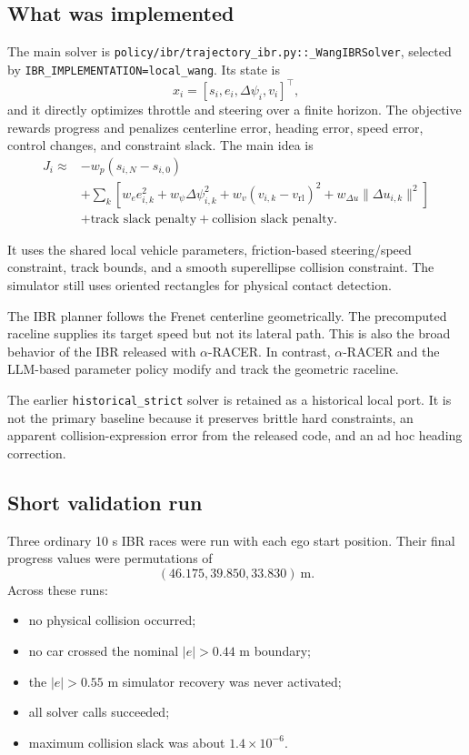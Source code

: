 \documentclass[11pt]{article}
\newcommand{\code}[1]{\texttt{#1}}
\begin{document}
\subsection{What was implemented}

The main solver is \code{policy/ibr/trajectory\_ibr.py::\_WangIBRSolver}, selected by
\code{IBR\_IMPLEMENTATION=local\_wang}. Its state is
\[
  x_i=[s_i,e_i,\Delta\psi_i,v_i]^\top,
\]
and it directly optimizes throttle and steering over a finite horizon. The
objective rewards progress and penalizes centerline error, heading error, speed
error, control changes, and constraint slack. The main idea is
\[
\begin{split}
J_i \approx{}&-w_p(s_{i,N}-s_{i,0})\\
&+\sum_k\left[
w_e e_{i,k}^2+w_\psi\Delta\psi_{i,k}^2
+w_v(v_{i,k}-v_{\mathrm{rl}})^2
+w_{\Delta u}\|\Delta u_{i,k}\|^2\right]\\
&+\text{track slack penalty}+\text{collision slack penalty}.
\end{split}
\]

It uses the shared local vehicle parameters, friction-based steering/speed
constraint, track bounds, and a smooth superellipse collision constraint. The
simulator still uses oriented rectangles for physical contact detection.

The IBR planner follows the Frenet centerline geometrically. The precomputed
raceline supplies its target speed but not its lateral path. This is also the
broad behavior of the IBR released with $\alpha$-RACER. In contrast,
$\alpha$-RACER and the LLM-based parameter policy modify and track the geometric
raceline.

The earlier \code{historical\_strict} solver is retained as a historical local
port. It is not the primary baseline because it preserves brittle hard
constraints, an apparent collision-expression error from the released code, and
an ad hoc heading correction.

\subsection{Short validation run}

Three ordinary 10 s IBR races were run with each ego start position. Their final
progress values were permutations of
\[
  (46.175,39.850,33.830)\ \mathrm{m}.
\]
Across these runs:
\begin{itemize}
  \item no physical collision occurred;
  \item no car crossed the nominal $|e|>0.44$ m boundary;
  \item the $|e|>0.55$ m simulator recovery was never activated;
  \item all solver calls succeeded;
  \item maximum collision slack was about $1.4\times10^{-6}$.
\end{itemize}
\end{document}
